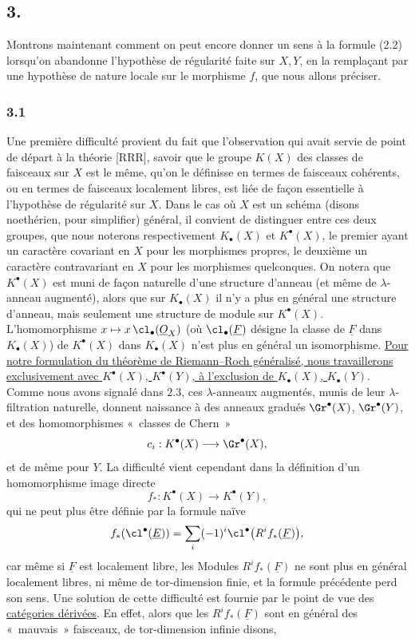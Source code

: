 \subsection*{3.}
Montrons maintenant comment on peut encore donner un sens à la formule (2.2) lorsqu'on abandonne l'hypothèse de régularité faite sur $X,Y$, en la remplaçant par une hypothèse de nature locale sur le morphisme $f$, que nous allons préciser.

\subsubsection*{3.1}
Une première difficulté provient du fait que l'observation qui avait servie de point de départ à la théorie [RRR], savoir que le groupe $K(X)$ des classes de faisceaux sur $X$ est le même, qu'on le définisse en termes de faisceaux cohérents, ou en termes de faisceaux localement libres, est liée de façon essentielle à l'hypothèse de régularité sur $X$. Dans le cas où $X$ est un schéma (disons noethérien, pour simplifier) général, il convient de distinguer entre ces deux groupes, que nous noterons respectivement $K_\bullet(X)$ et $K^\bullet(X)$, le premier ayant un caractère covariant en $X$ pour les morphismes propres, le deuxième un caractère contravariant en $X$ pour les morphismes quelconques. On notera que $K^\bullet(X)$ est muni de façon naturelle d'une structure d'anneau (et même de $\lambda$-anneau augmenté), alors que sur $K_\bullet(X)$ il n'y a plus en général une structure d'anneau, mais seulement une structure de module sur $K^\bullet(X)$. L'homomorphisme $x\mapsto x\,\cl_\bullet(\underline O_X)$ (où $\cl_\bullet(\underline F)$ désigne la classe de $\underline F$ dans $K_\bullet(X)$) de $K^\bullet(X)$ dans $K_\bullet(X)$ n'est plus en général un isomorphisme. \uline{Pour notre formulation du théorème de Riemann--Roch généralisé, nous travaillerons exclusivement avec $K^\bullet(X)$, $K^\bullet(Y)$, à l'exclusion de $K_\bullet(X)$, $K_\bullet(Y)$}. Comme nous avons signalé dans 2.3, ces $\lambda$-anneaux augmentés, munis de leur $\lambda$-filtration naturelle, donnent naissance à des anneaux gradués $\Gr^\bullet(X)$, $\Gr^\bullet(Y)$, et des homomorphismes «~classes de Chern~»
\[
c_i:K^\bullet(X)\longrightarrow \Gr^\bullet(X),
\]
et de même pour $Y$. La difficulté vient cependant dans la définition d'un homomorphisme image directe
\begin{equation}\tag{3.1}
f_*:K^\bullet(X)\longrightarrow K^\bullet(Y),
\end{equation}
qui ne peut plus être définie par la formule naïve
\[
f_*(\cl^\bullet(\underline E))=\sum_i(-1)^i\cl^\bullet\bigl(R^if_*(\underline F)\bigr),
\]
car même si $\underline F$ est localement libre, les Modules $R^if_*(\underline F)$ ne sont plus en général localement libres, ni même de tor-dimension finie, et la formule précédente perd son sens. Une solution de cette difficulté est fournie par le point de vue des \underline{catégories dérivées}. En effet, alors que les $R^if_*(\underline F)$ sont en général des «~mauvais~» faisceaux, de tor-dimension infinie disons,
